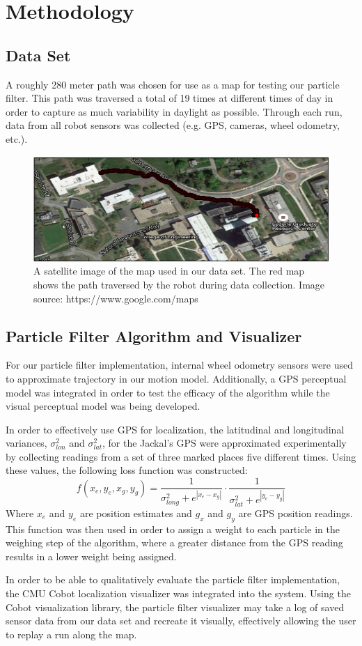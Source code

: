 \documentclass[letterpaper, 12 pt, conference]{ieeeconf}  %
\begin{document}
\section{Methodology}

\subsection{Data Set}
A roughly 280 meter path was chosen for use as a map for testing our particle filter. This path was traversed a total of 19 times at different times of day in order to capture as much variability in daylight as possible. Through each run, data from all robot sensors was collected (e.g. GPS, cameras, wheel odometry, etc.).  

\begin{figure}[h]
\centering
\includegraphics[scale=0.5]{map}
\caption{A satellite image of the map used in our data set. The red map shows the path traversed by the robot during data collection. Image source: https://www.google.com/maps}
\end{figure}

\subsection{Particle Filter Algorithm and Visualizer}
For our particle filter implementation, internal wheel odometry sensors were used to approximate trajectory in our motion model. Additionally, a GPS perceptual model was integrated in order to test the efficacy of the algorithm while the visual perceptual model was being developed. 
\par
In order to effectively use GPS for localization, the latitudinal and longitudinal variances, $\sigma _{lon}^2$ and $\sigma _{lat}^2$, for the Jackal's GPS were approximated experimentally by collecting readings from a set of three marked places five different times. Using these values, the following loss function was constructed:
$$
f(x_e,y_e,x_g,y_g)= \frac{1}{\sigma _{long}^2 + e^{|x_e-x_g|}}\cdot \frac{1}{\sigma _{lat}^2 + e^{|y_e-y_g|}}
$$
Where $x_e$ and $y_e$ are position estimates and $g_x$ and $g_y$ are GPS position readings. This function was then used in order to assign a weight to each particle in the weighing step of the algorithm, where a greater distance from the GPS reading results in a lower weight being assigned.
\par
In order to be able to qualitatively evaluate the particle filter implementation, the CMU Cobot \cite{cobot} localization visualizer was integrated into the system. Using the Cobot visualization library, the particle filter visualizer may take a log of saved sensor data from our data set and recreate it visually, effectively allowing the user to replay a run along the map. 
\end{document}
